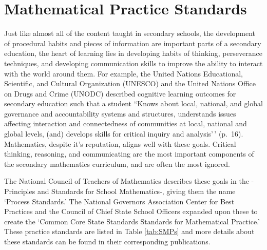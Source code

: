 \documentclass[
]{book}
\theoremstyle{definition}
\theoremstyle{definition}
\theoremstyle{definition}
\theoremstyle{definition}
\theoremstyle{remark}
\begin{document}
\hypertarget{mathematical-practice-standards}{%
\section{Mathematical Practice Standards}\label{mathematical-practice-standards}}

Just like almost all of the content taught in secondary schools, the development of procedural habits and pieces of information are important parts of a secondary education, the heart of learning lies in developing habits of thinking, perseverance techniques, and developing communication skills to improve the ability to interact with the world around them. For example, the United Nations Educational, Scientific, and Cultural Organization (UNESCO) and the United Nations Office on Drugs and Crime (UNODC) \citeyearpar{UNESCO} described cognitive learning outcomes for secondary education such that a student ``Knows about local, national, and global governance and accountability systems and structures, understands issues affecting interaction and connectedness of communities at local, national and global levels, (and) develops skills for critical inquiry and analysis'\,' (p.~16). Mathematics, despite it's reputation, aligns well with these goals. Critical thinking, reasoning, and communicating are the most important components of the secondary mathematics curriculum, and are often the most ignored.

The National Council of Teachers of Mathematics \citeyearpar{PSSM} describes these goals in the -Principles and Standards for School Mathematics-, giving them the name `Process Standards.' The National Governors Association Center for Best Practices and the Council of Chief State School Officers \citep{CCSS} expanded upon these to create the `Common Core State Standards Standards for Mathematical Practice.' These practice standards are listed in Table \ref{tab:SMPs} and more details about these standards can be found in their corresponding publications.
\end{document}
